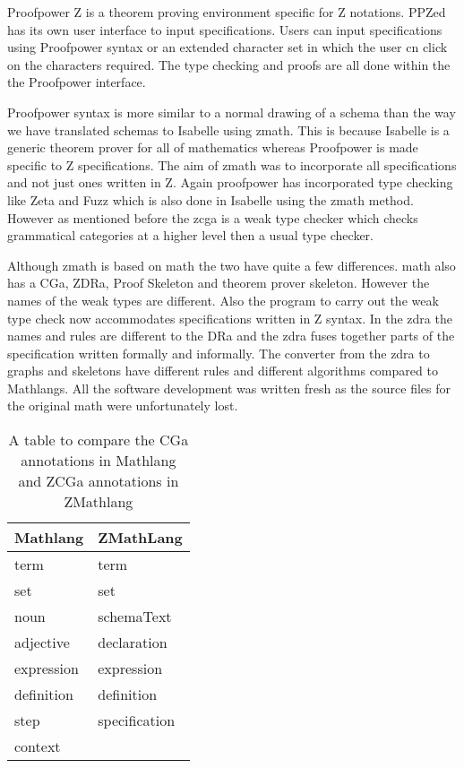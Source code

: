 Proofpower Z is a theorem proving environment specific for Z notations. PPZed has
its own user interface to input specifications. Users can input specifications
using Proofpower syntax or an extended character set in which the user cn click
on the characters required. The type checking and proofs are all done within the
the Proofpower interface.

Proofpower syntax is more similar to a normal drawing of a schema
than the way we have translated schemas to Isabelle using \gls{zmath}. This is
because Isabelle is a generic theorem prover for all of mathematics whereas
Proofpower is made specific to Z specifications. The aim of \gls{zmath} was to
incorporate all specifications and not just ones written in Z. Again proofpower
has incorporated type checking like Zeta and Fuzz which is also done in Isabelle
using the \gls{zmath} method. However as mentioned before the \gls{zcga} is a
weak type checker which checks grammatical categories at a higher level then a
usual type checker.

Although \gls{zmath} is based on \gls{math} the two have quite a few
differences. \Gls{math} also has a CGa, ZDRa, Proof Skeleton and theorem prover
skeleton. However the names of the weak types are different. Also the program to
carry out the weak type check now accommodates specifications written in Z
syntax. In the \gls{zdra} the names and rules are different to the DRa and the
\gls{zdra} fuses together parts of the specification written formally and
informally. The converter from the
\gls{zdra} to graphs and skeletons have different rules and different algorithms
compared to Mathlangs. All the software development was written fresh as the source files
for the original \gls{math} were unfortunately lost.

\begin{table}[H]
    \centering
\begin{tabular}{|l | l|}
\hline
Mathlang & ZMathLang \\
\hline
term & term \\
set & set \\
noun & schemaText \\
adjective & declaration \\
expression & expression \\
definition & definition \\
step & specification \\
context & \\
\hline
\end{tabular}
\caption{A table to compare the CGa annotations in Mathlang and ZCGa annotations in ZMathlang \label{tab:comparecga}}
\end{table}

